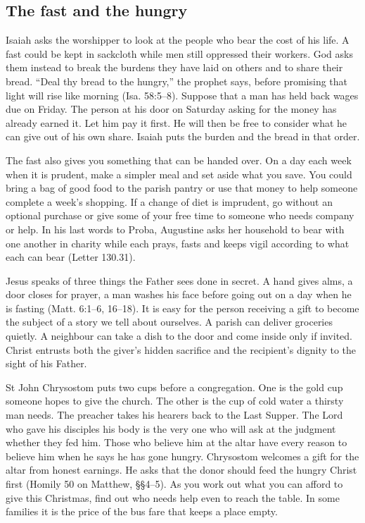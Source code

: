 \subsection{The fast and the hungry}

Isaiah asks the worshipper to look at the people who bear the cost of
his life. A fast could be kept in sackcloth while men still oppressed
their workers. God asks them instead to break the burdens they have laid
on others and to share their bread. “Deal thy bread to the hungry,” the
prophet says, before promising that light will rise like morning (Isa.
58:5--8). Suppose that a man has held back wages due on Friday. The person
at his door on Saturday asking for the money has already earned it.
Let him pay it first. He will then be free to consider what he can
give out of his own share. Isaiah puts the burden and the bread in
that order.

The fast also gives you something that can be handed over. On a day
each week when it is prudent, make a simpler meal and set aside what you
save. You could bring a bag of good food to the parish pantry or use that
money to help someone complete a week's shopping. If a change of diet is
imprudent, go without an optional purchase or give some of your free time
to someone who needs company or help. In his last words to Proba, Augustine
asks her household to bear with one another in charity while each prays,
fasts and keeps vigil according to what each can bear (Letter 130.31).

Jesus speaks of three things the Father sees done in secret. A hand
gives alms, a door closes for prayer, a man washes his face before
going out on a day when he is fasting (Matt. 6:1--6, 16--18). It is
easy for the person receiving a gift to become the subject of a story
we tell about ourselves. A parish can deliver groceries quietly.
A neighbour can take a dish to the door and come inside only if
invited. Christ entrusts both the giver's hidden sacrifice and the
recipient's dignity to the sight of his Father.

St John Chrysostom puts two cups before a congregation. One is the
gold cup someone hopes to give the church. The other is the cup of
cold water a thirsty man needs. The preacher takes his hearers back
to the Last Supper. The Lord who gave his disciples his body is the very one who
will ask at the judgment whether they fed him. Those who believe him
at the altar have every reason to believe him when he says he has
gone hungry. Chrysostom welcomes a gift for the altar from honest
earnings. He asks that the donor should feed the hungry Christ first
(Homily 50 on Matthew, \S\S4--5). As you work out what you can afford
to give this Christmas, find out who needs help even to reach the
table. In some families it is the price of the bus fare that keeps a
place empty.

